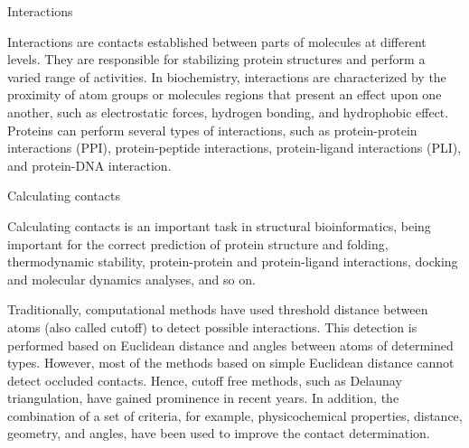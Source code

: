 Interactions

Interactions are contacts established between parts of molecules at different levels. They are responsible for stabilizing protein structures and perform a varied range of activities. In biochemistry, interactions are characterized by the proximity of atom groups or molecules regions that present an effect upon one another, such as electrostatic forces, hydrogen bonding, and hydrophobic effect. Proteins can perform several types of interactions, such as protein-protein interactions (PPI), protein-peptide interactions, protein-ligand interactions (PLI), and protein-DNA interaction.

Calculating contacts

Calculating contacts is an important task in structural bioinformatics, being important for the correct prediction of protein structure and folding, thermodynamic stability, protein-protein and protein-ligand interactions, docking and molecular dynamics analyses, and so on.

Traditionally, computational methods have used threshold distance between atoms (also called cutoff) to detect possible interactions. This detection is performed based on Euclidean distance and angles between atoms of determined types. However, most of the methods based on simple Euclidean distance cannot detect occluded contacts. Hence, cutoff free methods, such as Delaunay triangulation, have gained prominence in recent years. In addition, the combination of a set of criteria, for example, physicochemical properties, distance, geometry, and angles, have been used to improve the contact determination.
